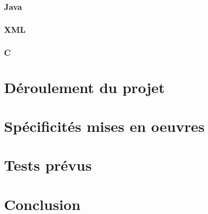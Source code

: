 		\subsection{Java}
		
		\subsection{XML}
		
		\subsection{C} 


		\chapter{Déroulement du projet}

		\chapter{Spécificités mises en oeuvres}

		\chapter{Tests prévus}

		\chapter{Conclusion}